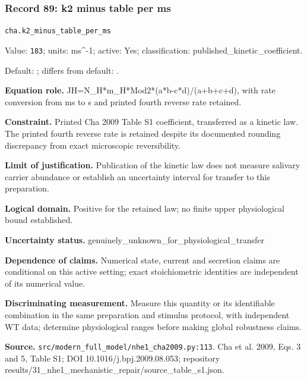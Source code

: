 \subsubsection*{Record 89: k2 minus table per ms}
{\small \nolinkurl{cha.k2_minus_table_per_ms}\par

Value: \texttt{183}; units: ms\textasciicircum{}-1; active: Yes; classification: published\_kinetic\_coefficient.\par

Default: ; differs from default: .\par

\textbf{Equation role.} JH=N\_H*m\_H*Mod2*(a*b-c*d)/(a+b+c+d), with rate conversion from ms to s and printed fourth reverse rate retained.\par

\textbf{Constraint.} Printed Cha 2009 Table S1 coefficient, transferred as a kinetic law. The printed fourth reverse rate is retained despite its documented rounding discrepancy from exact microscopic reversibility.\par

\textbf{Limit of justification.} Publication of the kinetic law does not measure salivary carrier abundance or establish an uncertainty interval for transfer to this preparation.\par

\textbf{Logical domain.} Positive for the retained law; no finite upper physiological bound established.\par

\textbf{Uncertainty status.} genuinely\_unknown\_for\_physiological\_transfer\par

\textbf{Dependence of claims.} Numerical state, current and secretion claims are conditional on this active setting; exact stoichiometric identities are independent of its numerical value.\par

\textbf{Discriminating measurement.} Measure this quantity or its identifiable combination in the same preparation and stimulus protocol, with independent WT data; determine physiological ranges before making global robustness claims.\par

\textbf{Source.} \nolinkurl{src/modern_full_model/nhe1_cha2009.py:113}. Cha et al. 2009, Eqs. 3 and 5, Table S1; DOI 10.1016/j.bpj.2009.08.053; repository results/31\_nhe1\_mechanistic\_repair/source\_table\_s1.json.\par}

